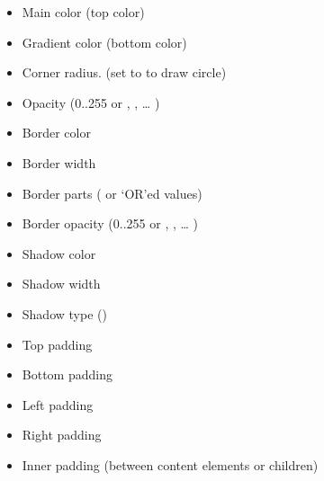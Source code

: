\documentclass[letterpaper,10pt,english]{sphinxmanual}
\begin{document}
\begin{itemize}
\item {} 
 Main color (top color)

\item {} 
 Gradient color (bottom color)

\item {} 
 Corner radius. (set to  to draw circle)

\item {} 
 Opacity (0..255 or , ,  … )

\item {} 
 Border color

\item {} 
 Border width

\item {} 
 Border parts ( or ‘OR’ed values)

\item {} 
 Border opacity (0..255 or , ,  … )

\item {} 
 Shadow color

\item {} 
 Shadow width

\item {} 
 Shadow type ()

\item {} 
 Top padding

\item {} 
 Bottom padding

\item {} 
 Left padding

\item {} 
 Right padding

\item {} 
 Inner padding (between content elements or children)

\end{itemize}
\end{document}
